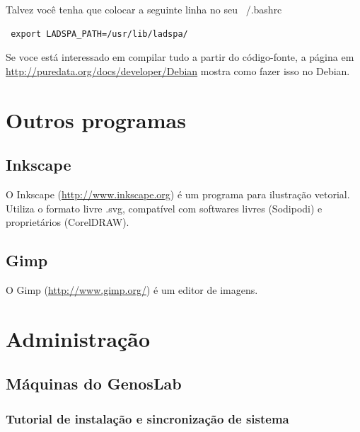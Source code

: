 \documentclass[12pt,brazil]{book}
\begin{document}
Talvez você tenha que colocar a seguinte linha no seu ~/.bashrc

\begin{verbatim}
 export LADSPA_PATH=/usr/lib/ladspa/
\end{verbatim}

Se voce está interessado em compilar tudo a partir do código-fonte, a
página em \url{http://puredata.org/docs/developer/Debian} mostra como
fazer isso no Debian.

\part{Outros programas}
\label{part:outros-programas}

\chapter{Inkscape}
\label{cha:inkscape}

O Inkscape (\url{http://www.inkscape.org}) é um programa para
ilustração vetorial. Utiliza o formato livre .svg, compatível com
softwares livres (Sodipodi) e proprietários (CorelDRAW).

\chapter{Gimp}
\label{cha:gimp}

O Gimp (\url{http://www.gimp.org/}) é um editor de imagens.

\part{Administração}
\label{part:administracao}

\chapter{Máquinas do GenosLab}
\label{cha:maquinas-do-genoslab}

\section{Tutorial de instalação e sincronização de sistema}
\label{sec:tutor-de-inst}
\end{document}
